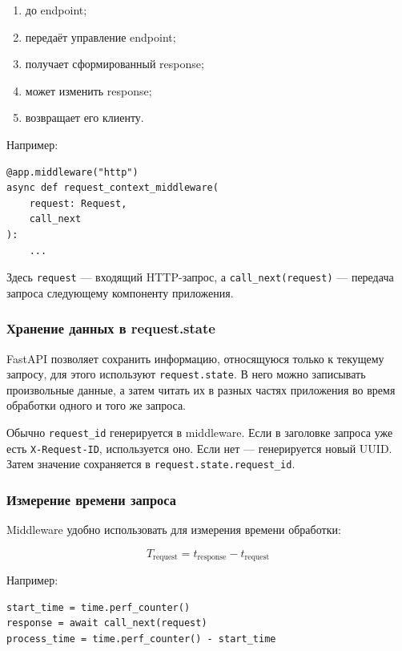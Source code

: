 \documentclass[12pt,a4paper]{article}
\begin{document}
\begin{enumerate}
    \item до endpoint;
    \item передаёт управление endpoint;
    \item получает сформированный response;
    \item может изменить response;
    \item возвращает его клиенту.
\end{enumerate}

Например:

\begin{lstlisting}[caption={Заготовка middleware}]
@app.middleware("http")
async def request_context_middleware(
    request: Request,
    call_next
):
    ...
\end{lstlisting}

Здесь \texttt{request} — входящий HTTP-запрос, а \texttt{call\_next(request)} — передача запроса следующему компоненту приложения.

\subsubsection{Хранение данных в request.state}

FastAPI позволяет сохранить информацию, относящуюся только к текущему запросу, для этого используют \texttt{request.state}. В него можно записывать произвольные данные, а затем читать их в разных частях приложения во время обработки одного и того же запроса.

Обычно \texttt{request\_id} генерируется в middleware. Если в заголовке запроса уже есть \texttt{X-Request-ID}, используется оно. Если нет — генерируется новый UUID. Затем значение сохраняется в \texttt{request.state.request\_id}.

\subsubsection{Измерение времени запроса}

Middleware удобно использовать для измерения времени обработки:

\begin{equation}
T_{\text{request}} = t_{\text{response}} - t_{\text{request}}
\end{equation}

Например:

\begin{lstlisting}[caption={Измерение времени обработки}]
start_time = time.perf_counter()
response = await call_next(request)
process_time = time.perf_counter() - start_time
\end{lstlisting}
\end{document}
